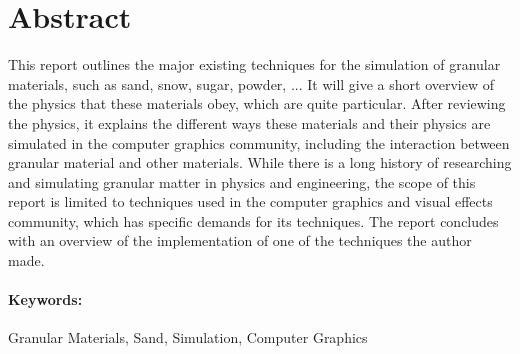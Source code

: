 
\ifx\isEmbedded\undefined


\fi

\section*{Abstract}
\label{sec:abstract}

This report outlines the major existing techniques for the simulation of granular materials, such as sand, snow, sugar, powder, ...  It will give a short overview of the physics that these materials obey, which are quite particular. After reviewing the physics, it explains the different ways these materials and their physics are simulated in the computer graphics community, including the interaction between granular material and other materials. While there is a long history of researching and simulating granular matter in physics and engineering, the scope of this report is limited to techniques used in the computer graphics and visual effects community, which has specific demands for its techniques. The report concludes with an overview of the implementation of one of the techniques the author made.

\paragraph*{Keywords:}{Granular Materials, Sand, Simulation, Computer Graphics}



\ifx\isEmbedded\undefined


\pagebreak

\fi